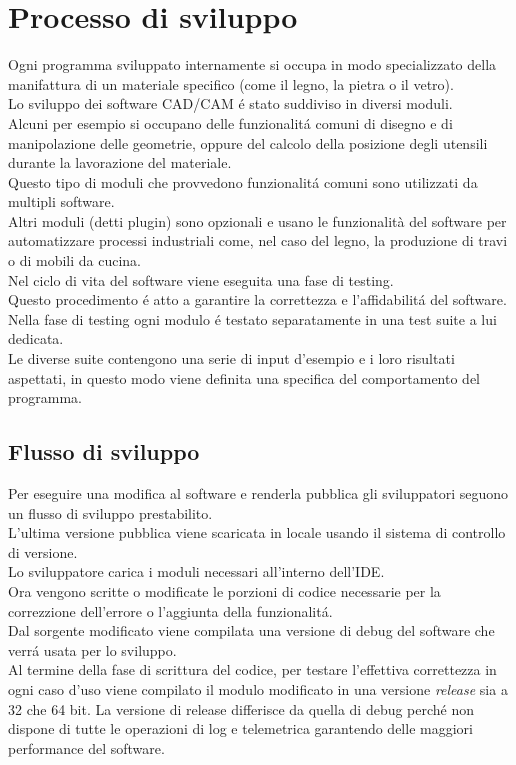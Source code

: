 \chapter{Processo di sviluppo}
    Ogni programma sviluppato internamente si occupa in modo specializzato della manifattura di un materiale specifico (come il legno, la pietra o il vetro).\\
    Lo sviluppo dei software CAD/CAM \'e stato suddiviso in diversi moduli.\\
    Alcuni per esempio si occupano delle funzionalit\'a comuni di disegno e di manipolazione delle geometrie, oppure del calcolo della posizione degli utensili durante la lavorazione del materiale.\\
    Questo tipo di moduli che provvedono funzionalit\'a comuni sono utilizzati da multipli software.\\
    Altri moduli (detti plugin) sono opzionali e usano le funzionalità del software per automatizzare processi industriali come, nel caso del legno, la produzione di travi o di mobili da cucina.\\
    
    Nel ciclo di vita del software viene eseguita una fase di testing.\\
    Questo procedimento \'e atto a garantire la correttezza e l'affidabilit\'a del software.\\ 
    Nella fase di testing ogni modulo \'e testato separatamente in una test suite a lui dedicata.\\
    Le diverse suite contengono una serie di input d'esempio e i loro risultati aspettati, in questo modo viene definita una specifica del comportamento del programma.\\

    \section{Flusso di sviluppo}
        Per eseguire una modifica al software e renderla pubblica gli sviluppatori seguono un flusso di sviluppo prestabilito.\\
        L'ultima versione pubblica viene scaricata in locale usando il sistema di controllo di versione.\\
        Lo sviluppatore carica i moduli necessari all'interno dell'IDE.\\
        Ora vengono scritte o modificate le porzioni di codice necessarie per la correzzione dell'errore o l'aggiunta della funzionalit\'a.\\
        Dal sorgente modificato viene compilata una versione di debug del software che verr\'a usata per lo sviluppo.\\
        Al termine della fase di scrittura del codice, per testare l'effettiva correttezza in ogni caso d'uso viene compilato il modulo modificato in una versione \textit{release} sia a 32 che 64 bit.
        La versione di release differisce da quella di debug perch\'e non dispone di tutte le operazioni di log e telemetrica garantendo delle maggiori performance del software.\\
        
